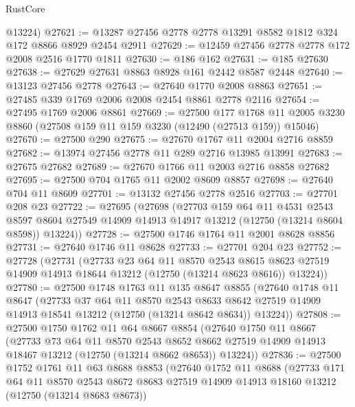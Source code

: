 \begin{lexlean}{RustCore}
\begin{coremodule}
      @13224)
@27621 := @13287 @27456 @2778 @2778 @13291 @8582 @1812 @324 @172 @8866 @8929 @2454 @2911
@27629 := @12459 @27456 @2778 @2778 @172 @2008 @2516 @1770 @1811
@27630 := @186 @162
@27631 := @185 @27630
@27638 := @27629 @27631 @8863 @8928 @161 @2442 @8587 @2448
@27640 := @13123 @27456 @2778
@27643 := @27640 @1770 @2008 @8863
@27651 := @27485 @339 @1769 @2006 @2008 @2454 @8861 @2778 @2116
@27654 := @27495 @1769 @2006 @8861
@27669 := @27500
    @177
    @1768
    @11
    @2005
    @3230
    @8860
    (@27508 @159 @11 @159 @3230 (@12490 (@27513 @159)) @15046)
@27670 := @27500 @290
@27675 := @27670 @1767 @11 @2004 @2716 @8859
@27682 := @13974 @27456 @2778 @11 @289 @2716 @13985 @13991
@27683 := @27675 @27682
@27689 := @27670 @1766 @11 @2003 @2716 @8858 @27682
@27695 := @27500 @704 @1765 @11 @2002 @8609 @8857
@27698 := @27640 @704 @11 @8609
@27701 := @13132 @27456 @2778 @2516
@27703 := @27701 @208 @23
@27722 := @27695
    (@27698
      (@27703
        @159
        @64
        @11
        @4531
        @2543
        @8597
        @8604
        @27549
        @14909
        @14913
        @14917
        @13212
        (@12750 (@13214 @8604 @8598))
        @13224))
@27728 := @27500 @1746 @1764 @11 @2001 @8628 @8856
@27731 := @27640 @1746 @11 @8628
@27733 := @27701 @204 @23
@27752 := @27728
    (@27731
      (@27733
        @23
        @64
        @11
        @8570
        @2543
        @8615
        @8623
        @27519
        @14909
        @14913
        @18644
        @13212
        (@12750 (@13214 @8623 @8616))
        @13224))
@27780 := @27500
    @1748
    @1763
    @11
    @135
    @8647
    @8855
    (@27640
      @1748
      @11
      @8647
      (@27733
        @37
        @64
        @11
        @8570
        @2543
        @8633
        @8642
        @27519
        @14909
        @14913
        @18541
        @13212
        (@12750 (@13214 @8642 @8634))
        @13224))
@27808 := @27500
    @1750
    @1762
    @11
    @64
    @8667
    @8854
    (@27640
      @1750
      @11
      @8667
      (@27733
        @73
        @64
        @11
        @8570
        @2543
        @8652
        @8662
        @27519
        @14909
        @14913
        @18467
        @13212
        (@12750 (@13214 @8662 @8653))
        @13224))
@27836 := @27500
    @1752
    @1761
    @11
    @63
    @8688
    @8853
    (@27640
      @1752
      @11
      @8688
      (@27733
        @171
        @64
        @11
        @8570
        @2543
        @8672
        @8683
        @27519
        @14909
        @14913
        @18160
        @13212
        (@12750 (@13214 @8683 @8673))

\end{coremodule}
\end{lexlean}
